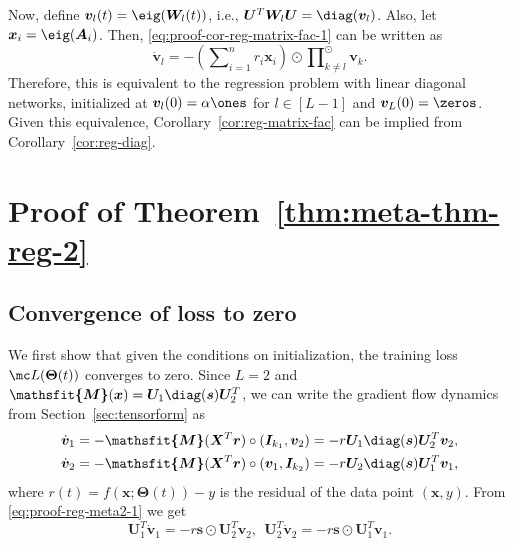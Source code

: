 \documentclass{article} %
\def\vr{{\bm{r}}}
\def\vs{{\bm{s}}}
\def\vv{{\bm{v}}}
\def\vx{{\bm{x}}}
\def\mA{{\bm{A}}}
\def\mI{{\bm{I}}}
\def\mU{{\bm{U}}}
\def\mW{{\bm{W}}}
\def\mX{{\bm{X}}}
\newcommand{\tens}[1]{\bm{\mathsfit{#1}}}
\def\tM{{\tens{M}}}
\newcommand{\bTheta}{\bm{\Theta}}
\begin{document}
Now, define $\vv_l(t) = \eig(\mW_l(t))$, i.e., $\mU^T \mW_l \mU = \diag(\vv_l)$. Also, let $\vx_i = \eig(\mA_i)$. Then, \eqref{eq:proof-cor-reg-matrix-fac-1} can be written as
\begin{equation*}
    \dot \vv_l = -(\sum\nolimits_{i=1}^n r_i \vx_i) \odot \prod\nolimits_{k\neq l}^{\odot} \vv_k.
\end{equation*}
Therefore, this is equivalent to the regression problem with linear diagonal networks, initialized at $\vv_l(0) = \alpha \ones$ for $l \in [L-1]$ and $\vv_L(0) = \zeros$.
Given this equivalence, Corollary~\ref{cor:reg-matrix-fac} can be implied from Corollary~\ref{cor:reg-diag}.



\section{Proof of Theorem~\ref{thm:meta-thm-reg-2}}
\label{sec:proof-meta-thm-reg-2}
\subsection{Convergence of loss to zero}
We first show that given the conditions on initialization, the training loss $\mc L(\bTheta(t))$ converges to zero.
Since $L=2$ and $\tM(\vx) = \mU_1\diag(\vs)\mU_2^T$, we can write the gradient flow dynamics from Section~\ref{sec:tensorform} as
\begin{equation}
\label{eq:proof-reg-meta2-1}
\begin{aligned}
    \dot \vv_1
    &= -\tM(\mX^T \vr) \circ (\mI_{k_1}, \vv_2)
    = -r \mU_1 \diag(\vs) \mU_2^T \vv_2,\\
    \dot \vv_2
    &= -\tM(\mX^T \vr) \circ (\vv_1, \mI_{k_2})
    = -r \mU_2 \diag(\vs) \mU_1^T \vv_1,
\end{aligned}
\end{equation}
where $r(t) = f(\vx;\bTheta(t))-y$ is the residual of the data point $(\vx,y)$.
From \eqref{eq:proof-reg-meta2-1} we get
\begin{equation}
\label{eq:proof-reg-meta2-2}
    \mU_1^T \dot \vv_1 = -r \vs \odot \mU_2^T \vv_2,~~
    \mU_2^T \dot \vv_2 = -r \vs \odot \mU_1^T \vv_1.
\end{equation}
\end{document}
